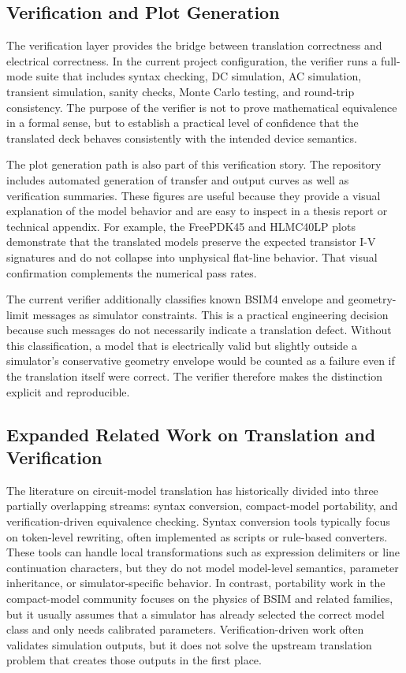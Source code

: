 \documentclass[10pt,twocolumn]{article}
\begin{document}
\subsection{Verification and Plot Generation}

The verification layer provides the bridge between translation correctness and electrical correctness. In the current project configuration, the verifier runs a full-mode suite that includes syntax checking, DC simulation, AC simulation, transient simulation, sanity checks, Monte Carlo testing, and round-trip consistency. The purpose of the verifier is not to prove mathematical equivalence in a formal sense, but to establish a practical level of confidence that the translated deck behaves consistently with the intended device semantics.

The plot generation path is also part of this verification story. The repository includes automated generation of transfer and output curves as well as verification summaries. These figures are useful because they provide a visual explanation of the model behavior and are easy to inspect in a thesis report or technical appendix. For example, the FreePDK45 and HLMC40LP plots demonstrate that the translated models preserve the expected transistor I-V signatures and do not collapse into unphysical flat-line behavior. That visual confirmation complements the numerical pass rates.

The current verifier additionally classifies known BSIM4 envelope and geometry-limit messages as simulator constraints. This is a practical engineering decision because such messages do not necessarily indicate a translation defect. Without this classification, a model that is electrically valid but slightly outside a simulator's conservative geometry envelope would be counted as a failure even if the translation itself were correct. The verifier therefore makes the distinction explicit and reproducible.

\subsection{Expanded Related Work on Translation and Verification}

The literature on circuit-model translation has historically divided into three partially overlapping streams: syntax conversion, compact-model portability, and verification-driven equivalence checking. Syntax conversion tools typically focus on token-level rewriting, often implemented as scripts or rule-based converters. These tools can handle local transformations such as expression delimiters or line continuation characters, but they do not model model-level semantics, parameter inheritance, or simulator-specific behavior. In contrast, portability work in the compact-model community focuses on the physics of BSIM and related families, but it usually assumes that a simulator has already selected the correct model class and only needs calibrated parameters. Verification-driven work often validates simulation outputs, but it does not solve the upstream translation problem that creates those outputs in the first place.
\end{document}
